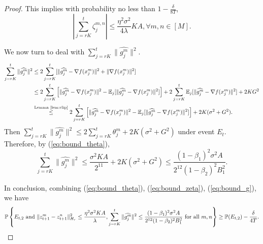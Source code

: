 \documentclass{article} %
\numberwithin{equation}{section}
\renewcommand{\eqref}[1]{(\ref{#1})}
\begin{document}
\begin{proof}
    This implies with probability no less than $1-\frac{\delta}{8T}$,
    \begin{equation}\label{eq:bound_zeta}
        |\sum_{j=rK}^t \zeta_j^{m,n}|\leq \frac{\eta^2\sigma^2}{4\lambda}KA, \forall m,n\in [M].
    \end{equation}

    We now turn to deal with $\sum_{j=rK}^{t}\|\widehat{g_j^m}\|^2$.
    \begin{equation}
        \begin{aligned}
            \sum_{j=rK}^{t}\|\widehat{g_j^m}\|^2
            &\leq 2\sum_{j=rK}^{t}[\|\widehat{g_j^m}-\nabla f(x_j^m)\|^2 + \|\nabla f(x_j^m)\|^2] \\
            &\leq  2\sum_{j=rK}^{t}\left[\|\widehat{g_j^m}-\nabla f(x_j^m)\|^2-\mathbb{E}_j[\|\widehat{g_j^m}-\nabla f(x_j^m)\|^2]\right] + 2\sum_{j=rK}^{t}\mathbb{E}_j[\|\widehat{g_j^m}-\nabla f(x_j^m)\|^2] + 2KG^2 \\
            &\overset{\text{Lemma \ref{lem:clip}}}{\leq}  2\sum_{j=rK}^{t}\left[\|\widehat{g_j^m}-\nabla f(x_j^m)\|^2-\mathbb{E}_j[\|\widehat{g_j^m}-\nabla f(x_j^m)\|^2]\right] + 2K(\sigma^2+G^2).
        \end{aligned}
    \end{equation}
    Then $\sum_{j=rK}^{t}\|\widehat{g_j^m}\|^2\leq 2\sum_{j=rK}^t \theta_j^m + 2K(\sigma^2+G^2)$ under event $E_t$.
    Therefore, by \eqref{eq:bound_theta}, 
    \begin{equation}\label{eq:bound_g}
        \sum_{j=rK}^{t}\|\widehat{g_j^m}\|^2\leq \frac{\sigma^2KA}{2^{11}} + 2K(\sigma^2+G^2) \leq \frac{(1-\beta_1)^2\sigma^2A}{2^{12}(1-\beta_2)^2B_1^2}.
    \end{equation}
    

    In conclusion, combining \eqref{eq:bound_theta}, \eqref{eq:bound_zeta}, \eqref{eq:bound_g}, we have
    \begin{equation}
        \mathbb{P} \left\{ E_{t,2} \text{ and } \|z_{t+1}^m-z_{t+1}^n\|_{H_r}^2 \leq \frac{\eta^2\sigma^2KA}{\lambda}, \sum_{j=rK}^{t}\|\widehat{g_j^m}\|^2\leq \frac{(1-\beta_1)^2\sigma^2A}{2^{12}(1-\beta_2)^2B_1^2}\text{ for all }m,n\right\}\geq \mathbb{P}(E_{t,2})-\frac{\delta}{4T}.
    \end{equation}
\end{proof}
\end{document}
